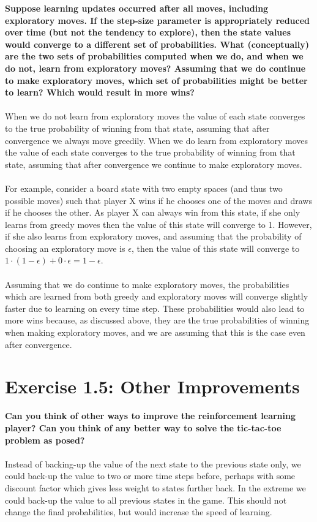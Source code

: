 \documentclass[a4paper,11pt]{article}
\numberwithin{equation}{section}
\theoremstyle{remark}
\begin{document}
\textbf{Suppose learning updates occurred after all moves, including exploratory moves. If the step-size parameter is appropriately reduced over time (but not the tendency to explore), then the state values would converge to a different set of probabilities. What (conceptually) are the two sets of probabilities computed when we do, and when we do not, learn from exploratory moves? Assuming that we do continue to make exploratory moves, which set of probabilities might be better to learn? Which would result in more wins?}
\\ \\
When we do not learn from exploratory moves the value of each state converges to the true probability of winning from that state, assuming that after convergence we always move greedily. When we do learn from exploratory moves the value of each state converges to the true probability of winning from that state, assuming that after convergence we continue to make exploratory moves.
\\ \\
For example, consider a board state with two empty spaces (and thus two possible moves) such that player X wins if he chooses one of the moves and draws if he chooses the other. As player X can always win from this state, if she only learns from greedy moves then the value of this state will converge to 1. However, if she also learns from exploratory moves, and assuming that the probability of choosing an exploratory move is $\epsilon$, then the value of this state will converge to $1 \cdot (1-\epsilon) + 0 \cdot \epsilon = 1-\epsilon$.
\\ \\
Assuming that we do continue to make exploratory moves, the probabilities which are learned from both greedy and exploratory moves will converge slightly faster due to learning on every time step. These probabilities would also lead to more wins because, as discussed above, they are the true probabilities of winning when making exploratory moves, and we are assuming that this is the case even after convergence. 

\section{Exercise 1.5: Other Improvements}

\textbf{Can you think of other ways to improve the reinforcement learning player? Can you think of any better way to solve the tic-tac-toe problem as posed?}
\\ \\
Instead of backing-up the value of the next state to the previous state only, we could back-up the value to two or more time steps before, perhaps with some discount factor which gives less weight to states further back. In the extreme we could back-up the value to all previous states in the game. This should not change the final probabilities, but would increase the speed of learning.
\end{document}
